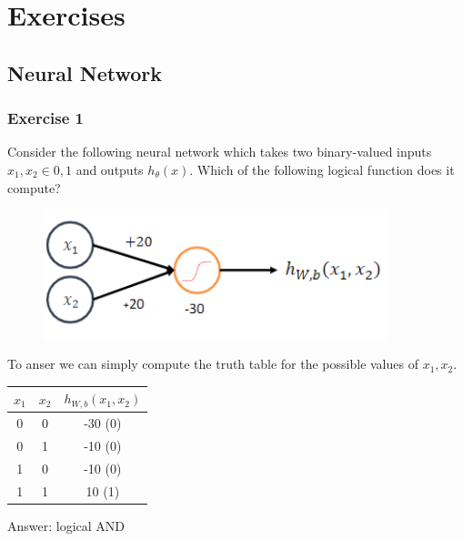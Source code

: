 \section{Exercises}
\renewcommand{\arraystretch}{1.5}
\subsection{Neural Network}
\subsubsection{Exercise 1}
Consider the following neural network which takes two binary-valued inputs $x_1,x_2 \in {0,1}$ and outputs $h_\theta(x)$. Which of the following logical function does it compute?
\begin{figure}[htbp]
    \centering
    \includegraphics[width=10cm]{ExerciseBook/01-NeuralNetwork/exercise1.png}\newline
\end{figure}\newline
To anser we can simply compute the truth table for the possible values of $x_1, x_2$.
\begin{center}
    
    \begin{tabular}{ |c |c |c |}
        \hline
        \textbf{$x_1$} & \textbf{$x_2$} & \textbf{$h_{W,b}(x_1,x_2)$} \\
        \hline
        0 & 0 & -30 (0) \\ 
        0 & 1 & -10 (0) \\  
        1 & 0 & -10 (0) \\
        1 & 1 & 10 (1)\\
        \hline
    \end{tabular}
    Answer: logical AND
\end{center}
